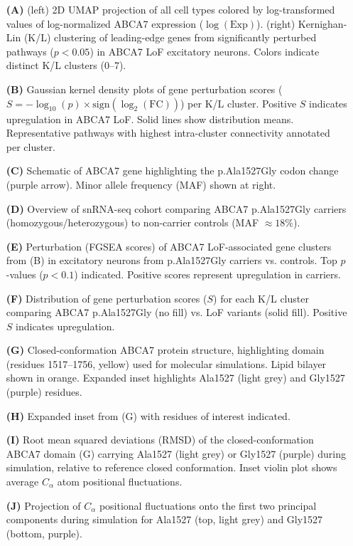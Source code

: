 \documentclass[12pt]{article}
\begin{document}
\begin{itemize}
    \item[\textbf{(A)}] (left) 2D UMAP projection of all cell types colored by log-transformed values of log-normalized ABCA7 expression ($\log(\text{Exp})$). (right) Kernighan-Lin (K/L) clustering of leading-edge genes from significantly perturbed pathways ($p<0.05$) in ABCA7 LoF excitatory neurons. Colors indicate distinct K/L clusters (0–7).
    \item[\textbf{(B)}] Gaussian kernel density plots of gene perturbation scores ($S=-\log_{10}(p)\times\text{sign}(\log_2(\text{FC}))$) per K/L cluster. Positive $S$ indicates upregulation in ABCA7 LoF. Solid lines show distribution means. Representative pathways with highest intra-cluster connectivity annotated per cluster.
    \item[\textbf{(C)}] Schematic of ABCA7 gene highlighting the p.Ala1527Gly codon change (purple arrow). Minor allele frequency (MAF) shown at right.
    \item[\textbf{(D)}] Overview of snRNA-seq cohort comparing ABCA7 p.Ala1527Gly carriers (homozygous/heterozygous) to non-carrier controls (MAF $\approx18\%$).
    \item[\textbf{(E)}] Perturbation (FGSEA scores) of ABCA7 LoF-associated gene clusters from (B) in excitatory neurons from p.Ala1527Gly carriers vs. controls. Top $p$-values ($p<0.1$) indicated. Positive scores represent upregulation in carriers.
    \item[\textbf{(F)}] Distribution of gene perturbation scores ($S$) for each K/L cluster comparing ABCA7 p.Ala1527Gly (no fill) vs. LoF variants (solid fill). Positive $S$ indicates upregulation.
    \item[\textbf{(G)}] Closed-conformation ABCA7 protein structure, highlighting domain (residues 1517–1756, yellow) used for molecular simulations. Lipid bilayer shown in orange. Expanded inset highlights Ala1527 (light grey) and Gly1527 (purple) residues.
    \item[\textbf{(H)}] Expanded inset from (G) with residues of interest indicated.
    \item[\textbf{(I)}] Root mean squared deviations (RMSD) of the closed-conformation ABCA7 domain (G) carrying Ala1527 (light grey) or Gly1527 (purple) during simulation, relative to reference closed conformation. Inset violin plot shows average $C_\alpha$ atom positional fluctuations.
    \item[\textbf{(J)}] Projection of $C_\alpha$ positional fluctuations onto the first two principal components during simulation for Ala1527 (top, light grey) and Gly1527 (bottom, purple).
\end{itemize} \clearpage
\end{document}
